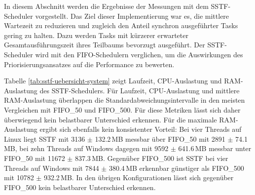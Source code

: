 \begin{sloppypar}
\noindent In diesem Abschnitt werden die Ergebnisse der Messungen mit dem \acs{SSTF}-Scheduler vorgestellt.
Das Ziel dieser Implementierung war es, die mittlere Wartezeit zu reduzieren und zugleich den Anteil synchron ausgeführter Tasks gering zu halten. Dazu werden Tasks mit kürzerer erwarteter Gesamtausführungszeit ihres Teilbaums bevorzugt ausgeführt.
Der \acs{SSTF}-Scheduler wird mit den \acs{FIFO}-Schedulern verglichen, um die Auswirkungen des Priorisierungsansatzes auf die Performance zu bewerten.

\begin{table}[H]
\caption{Laufzeit-, \acs{CPU}- und \acs{RAM}-Metriken des \acs{SSTF}-Schedulers für Linux und Windows bei einem, vier und zehn Threads, angegeben als Mittelwerte $\pm$ Standardabweichung aus $n=20$ Läufen}
\label{tab:sstf-uebersicht-system}
\centering
\begingroup
\setlength{\tabcolsep}{4pt}
\endgroup
\end{table}

\noindent Tabelle \ref{tab:sstf-uebersicht-system} zeigt Laufzeit, \acs{CPU}-Auslastung und \acs{RAM}-Auslastung des \acs{SSTF}-Schedulers. 
Für Laufzeit, \acs{CPU}-Auslastung und mittlere \acs{RAM}-Auslastung überlappen die Standardabweichungsintervalle in den meisten Vergleichen mit \acs{FIFO}\_50 und \acs{FIFO}\_500. Für diese Metriken lässt sich daher überwiegend kein belastbarer Unterschied erkennen. Für die maximale \acs{RAM}-Auslastung ergibt sich ebenfalls kein konsistenter Vorteil: Bei vier Threads auf Linux liegt \acs{SSTF} mit 3136 $\pm$ 132.2\,MB messbar über \acs{FIFO}\_50 mit 2891 $\pm$ 74.1\,MB, bei zehn Threads auf Windows dagegen mit 9592 $\pm$ 641.6\,MB messbar unter \acs{FIFO}\_50 mit 11672 $\pm$ 837.3\,MB. Gegenüber \acs{FIFO}\_500 ist \acs{SSTF} bei vier Threads auf Windows mit 7844 $\pm$ 380.4\,MB erkennbar günstiger als \acs{FIFO}\_500 mit 10782 $\pm$ 932.2\,MB. In den übrigen Konfigurationen lässt sich gegenüber \acs{FIFO}\_500 kein belastbarer Unterschied erkennen.



\end{sloppypar}
